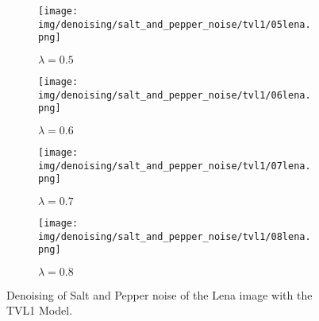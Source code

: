 \begin{figure}[ht]
    \centering
    \begin{subfigure}[b]{0.45\textwidth}
        \texttt{[image: img/denoising/salt\_and\_pepper\_noise/tvl1/05lena.png]}
        \caption{$\lambda = 0.5$}
    \end{subfigure}
    \begin{subfigure}[b]{0.45\textwidth}
        \texttt{[image: img/denoising/salt\_and\_pepper\_noise/tvl1/06lena.png]}
        \caption{$\lambda = 0.6$}
    \end{subfigure}
    \begin{subfigure}[b]{0.45\textwidth}
        \texttt{[image: img/denoising/salt\_and\_pepper\_noise/tvl1/07lena.png]}
        \caption{$\lambda = 0.7$}
    \end{subfigure}
    \begin{subfigure}[b]{0.45\textwidth}
        \texttt{[image: img/denoising/salt\_and\_pepper\_noise/tvl1/08lena.png]}
        \caption{$\lambda = 0.8$}
    \end{subfigure}
    \caption{Denoising of Salt and Pepper noise of the Lena image with the TVL1 Model.}
\label{fig:denoising_lena_tvl1_sap}
\end{figure}